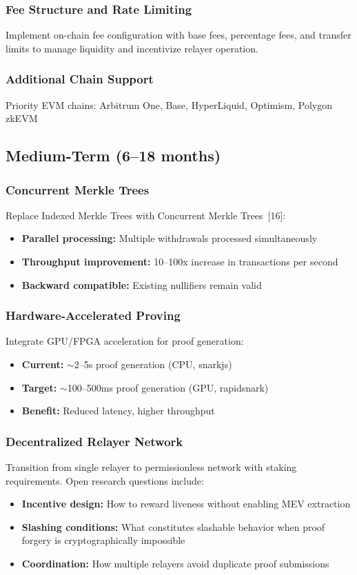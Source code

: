 \documentclass[11pt,a4paper,twoside]{article}
\begin{document}
\subsubsection{Fee Structure and Rate Limiting}
Implement on-chain fee configuration with base fees, percentage fees, and transfer limits to manage liquidity and incentivize relayer operation.

\subsubsection{Additional Chain Support}
Priority EVM chains: Arbitrum One, Base, HyperLiquid, Optimism, Polygon zkEVM

\subsection{Medium-Term (6--18 months)}

\subsubsection{Concurrent Merkle Trees}
Replace Indexed Merkle Trees with Concurrent Merkle Trees~[16]:
\begin{itemize}
    \item \textbf{Parallel processing:} Multiple withdrawals processed simultaneously
    \item \textbf{Throughput improvement:} 10--100x increase in transactions per second
    \item \textbf{Backward compatible:} Existing nullifiers remain valid
\end{itemize}

\subsubsection{Hardware-Accelerated Proving}
Integrate GPU/FPGA acceleration for proof generation:
\begin{itemize}
    \item \textbf{Current:} $\sim$2--5s proof generation (CPU, snarkjs)
    \item \textbf{Target:} $\sim$100--500ms proof generation (GPU, rapidsnark)
    \item \textbf{Benefit:} Reduced latency, higher throughput
\end{itemize}

\subsubsection{Decentralized Relayer Network}
Transition from single relayer to permissionless network with staking requirements. Open research questions include:
\begin{itemize}
    \item \textbf{Incentive design:} How to reward liveness without enabling MEV extraction
    \item \textbf{Slashing conditions:} What constitutes slashable behavior when proof forgery is cryptographically impossible
    \item \textbf{Coordination:} How multiple relayers avoid duplicate proof submissions
\end{itemize}
\end{document}
